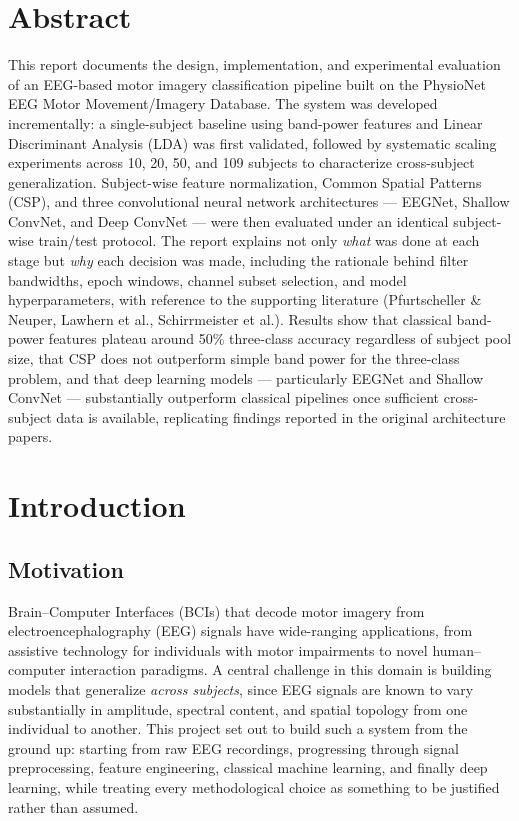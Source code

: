 \documentclass[11pt,a4paper]{article}
\begin{document}
\section*{Abstract}
This report documents the design, implementation, and experimental evaluation of an EEG-based motor imagery classification pipeline built on the PhysioNet EEG Motor Movement/Imagery Database. The system was developed incrementally: a single-subject baseline using band-power features and Linear Discriminant Analysis (LDA) was first validated, followed by systematic scaling experiments across 10, 20, 50, and 109 subjects to characterize cross-subject generalization. Subject-wise feature normalization, Common Spatial Patterns (CSP), and three convolutional neural network architectures --- EEGNet, Shallow ConvNet, and Deep ConvNet --- were then evaluated under an identical subject-wise train/test protocol. The report explains not only \emph{what} was done at each stage but \emph{why} each decision was made, including the rationale behind filter bandwidths, epoch windows, channel subset selection, and model hyperparameters, with reference to the supporting literature (Pfurtscheller \& Neuper, Lawhern et al., Schirrmeister et al.). Results show that classical band-power features plateau around 50\% three-class accuracy regardless of subject pool size, that CSP does not outperform simple band power for the three-class problem, and that deep learning models --- particularly EEGNet and Shallow ConvNet --- substantially outperform classical pipelines once sufficient cross-subject data is available, replicating findings reported in the original architecture papers.

\newpage

\section{Introduction}

\subsection{Motivation}
Brain--Computer Interfaces (BCIs) that decode motor imagery from electroencephalography (EEG) signals have wide-ranging applications, from assistive technology for individuals with motor impairments to novel human--computer interaction paradigms. A central challenge in this domain is building models that generalize \emph{across subjects}, since EEG signals are known to vary substantially in amplitude, spectral content, and spatial topology from one individual to another. This project set out to build such a system from the ground up: starting from raw EEG recordings, progressing through signal preprocessing, feature engineering, classical machine learning, and finally deep learning, while treating every methodological choice as something to be justified rather than assumed.
\end{document}
